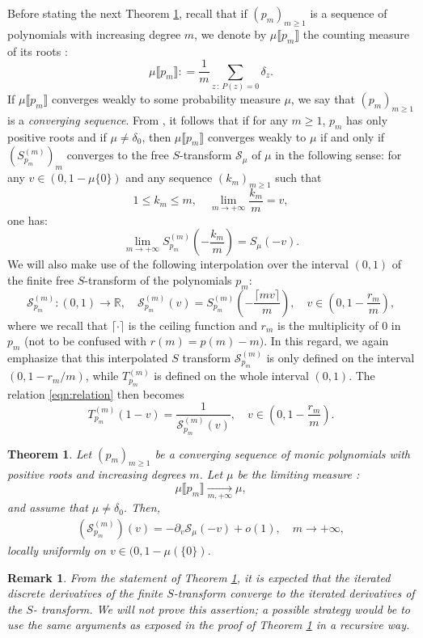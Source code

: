 \documentclass[12pt,reqno]{amsart}
\newtheorem{theorem}{Theorem}
\newtheorem{remark}{Remark}
\newcommand{\ceil}[1]{\lceil {#1} \rceil}
\begin{document}
Before stating the next Theorem \ref{thm:finitefreedifference}, recall that if $(p_m)_{m\geq 1}$ is a sequence of polynomials with increasing degree $m$, we denote by $\mu\llbracket p_m \rrbracket $ the counting measure of its roots : 
$$
\mu\llbracket p_m\rrbracket : = \frac{1}{m}\sum_{z\,:\,P(z)=0} \delta_z.
$$
If $\mu\llbracket p_m \rrbracket$ converges weakly to some probability measure $\mu$, we say that $(p_m)_{m \geq 1}$ is a \emph{converging sequence}. 
From \cite[Theorem 1.1]{arizmendi2024s}, it follows that if for any $m \geq 1$, $p_m$ has only positive roots and if $\mu \neq \delta_0$, 
then $\mu\llbracket p_m \rrbracket $ converges weakly to $\mu$ if and only if 
$(S^{(m)}_{p_m})_m$ converges to the free $S$-transform $\mathcal{S}_\mu$ of $\mu$ in the following sense: for any $v \in (0,1-\mu\{0\})$ 
and any sequence $(k_m)_{m \geq 1}$ such that
\begin{equation*}
 1 \leq k_m \leq m, \quad \lim_{m \rightarrow +\infty} \frac{k_m}{m} = v,    
\end{equation*}
one has: 
\begin{equation*}
\lim_{m \rightarrow +\infty} {S}_{p_m}^{(m)}\left(-\frac{k_m}{m}\right) = S_{\mu}(-v).     
\end{equation*}
We will also make use of the following interpolation over the interval $(0,1)$ of the finite free $S$-transform of the polynomials $p_m$:
	$$
		\mathcal{S}^{(m)}_{p_m} \colon (0,1)\to \mathbb{R},\quad \mathcal{S}^{(m)}_{p_m}(v) = S^{(m)}_{p_m}(-\frac{\ceil{mv}}{m}),\quad v \in \left(0,1-\frac{r_m}{m}\right),
	$$
	where we recall that $\ceil{\cdot}$ is the ceiling function and $r_m$ is the multiplicity of $0$ in $p_m$ (not to be confused with $r(m) = p(m) - m)$. In this regard, we again
emphasize that this interpolated $S$ transform $\mathcal{S}^{(m)}_{p_m}$ is only defined on the interval $(0,1-r_m/m)$, while $T^{(m)}_{p_m}$ is defined on the whole interval $(0,1)$. 
The relation \eqref{eqn:relation} then becomes 
$$
T^{(m)}_{p_m}(1-v) = \frac{1}{\mathcal{S}^{(m)}_{p_m}(v)}, \quad v \in\left(0, 1-\frac{r_m}{m}\right).
$$

\begin{theorem}
	\label{thm:finitefreedifference}
	Let $(p_m)_{m\geq 1}$ be a converging sequence of monic polynomials with positive roots and increasing degrees $m$. Let $\mu$ be the limiting measure :
	$$
		\mu\llbracket p_m \rrbracket \underset{m,+\infty}{\longrightarrow} \mu,
	$$
	and assume that $\mu \neq \delta_0$. Then, 
	\begin{align*}
		[\nabla^{(m)}](\mathcal{S}^{(m)}_{p_m})(v) = -\partial_v{\mathcal{S}}_{\mu}(-v) + o(1), \quad m \rightarrow +\infty,
	\end{align*}
	locally uniformly on $v \in (0,1-\mu(\{0\})$.
\end{theorem}
\begin{remark}
 From the statement of Theorem \ref{thm:finitefreedifference}, it is expected that the iterated discrete derivatives of the finite $S$-transform converge to the iterated derivatives of the $S$- transform. We will not prove this assertion; a possible strategy would be to use the same arguments as exposed in the proof of Theorem \ref{thm:finitefreedifference} in a recursive way. 
\end{remark}
\end{document}
